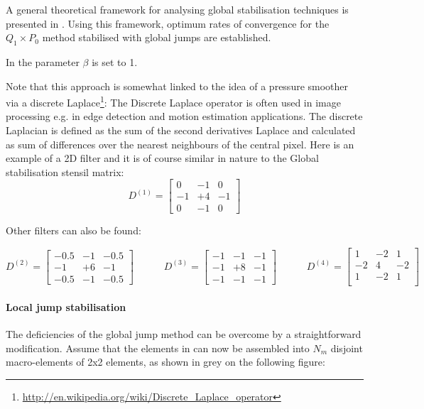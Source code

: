 A general theoretical framework for analysing global stabilisation techniques is
presented in \cite{hufr87}.
Using this framework, optimum rates of convergence for the $Q_1\times P_0$
method stabilised with global jumps are established.

In \cite{cao03} the parameter $\beta$ is set to 1.

Note that this approach is somewhat linked to the idea of a pressure smoother 
via a discrete Laplace\footnote{\url{http://en.wikipedia.org/wiki/Discrete_Laplace_operator}}:
The Discrete Laplace operator is often used in image processing e.g. in edge detection and motion 
estimation applications. The discrete Laplacian is defined as the sum of the second derivatives Laplace 
and calculated as sum of differences over the nearest neighbours of the central pixel.
Here is an example of a 2D filter and it is of course similar in nature to the Global 
stabilisation stensil matrix:
\[
D^{(1)}=
\left[
\begin{array}{ccc}
0 &-1 &0\\
-1 &+4 &-1\\
0 &-1 &0
\end{array}
\right]
\]

Other filters can also be found:

\[
D^{(2)}=
\left[
\begin{array}{ccc}
-0.5 &-1 &-0.5\\
-1 &+6 &-1\\
-0.5 &-1 &-0.5
\end{array}
\right]
\quad\quad\quad
D^{(3)}=
\left[
\begin{array}{ccc}
-1 &-1 &-1\\
-1 &+8 &-1\\
-1 &-1 &-1
\end{array}
\right]
\quad\quad\quad
D^{(4)}=
\left[
\begin{array}{ccc}
1 & -2 & 1 \\
-2 & 4 & -2 \\
1 & -2 & 1 \\
\end{array}
\right]
\]


\paragraph{Local jump stabilisation}

The deficiencies of the global jump method can be overcome by  
a straightforward modification. Assume that the elements in  
can now be assembled into $N_m$ disjoint macro-elements 
of 2x2 elements, as shown in grey on the following figure: 

